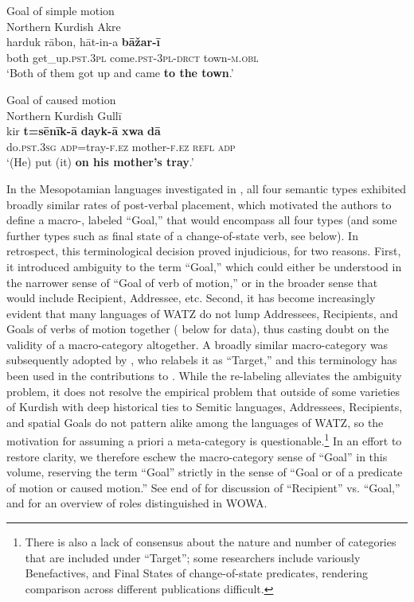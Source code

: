 \documentclass[output=paper,colorlinks,citecolor=brown,collectionchapter]{langscibook}
\begin{document}
\ea\label{Intro:ex:4} 
Goal of simple motion \\
Northern Kurdish Akre \citep{mackenzie_kurdish_1962} \\
\gll harduk rābon, hāt-in-a \textbf{bāžar-ī}  \\
both get\_up\textsc{.pst.3pl} come\textsc{.pst-3pl-drct} town\textsc{-m.obl} \\
\glt `Both of them got up and came \textbf{to the town}.'
\z

\ea\label{Intro:ex:5} 
Goal of caused motion  \\
Northern Kurdish Gullī \citep{mackenzie_kurdish_1962} \\
\gll kir \textbf{t=sēnīk-ā} \textbf{dayk-ā} \textbf{xwa} \textbf{dā} \\
do\textsc{.pst.3sg} \textsc{adp=}tray\textsc{-f.ez} mother\textsc{-f.ez} \textsc{refl} \textsc{adp} \\
\glt `(He) put (it) \textbf{on his mother's tray}.'
\z

In the Mesopotamian languages investigated in \citet{haig_post-predicate_2014}, all four semantic types exhibited broadly similar rates of post-verbal placement, which motivated the authors to define a macro-, labeled ``Goal,'' that would encompass all four types (and some further types such as final state of a change-of-state verb, see below). In retrospect, this terminological decision proved injudicious, for two reasons. First, it introduced ambiguity to the term ``Goal,'' which could either be understood in the narrower sense of ``Goal of verb of motion,'' or in the broader sense that would include Recipient, Addressee, etc. Second, it has become increasingly evident that many languages of WATZ do not lump Addressees, Recipients, and Goals of verbs of motion together ( below for data), thus casting doubt on the validity of a macro-category altogether. A broadly similar macro-category was subsequently adopted by \citet{asadpour_typologizing_2022,asadpour_word_2022}, who relabels it as ``Target,'' and this terminology has been used in the contributions to \citet{asadpour_Jugel_2022}. While the re-labeling alleviates the ambiguity problem, it does not resolve the empirical problem that outside of some varieties of Kurdish with deep historical ties to Semitic languages, Addressees, Recipients, and spatial Goals do not pattern alike among the  languages of WATZ, so the motivation for assuming a priori a meta-category is questionable.\footnote{There is also a lack of consensus about the nature and number of categories that are included under ``Target''; some researchers include variously Benefactives, and Final States of change-of-state predicates, rendering comparison across different publications difficult.} In an effort to restore clarity, we therefore eschew the macro-category sense of ``Goal'' in this volume, reserving the term ``Goal'' strictly in the sense of ``Goal or  of a predicate of motion or caused motion.'' See end of  for discussion of ``Recipient'' vs. ``Goal,'' and  for an overview of roles distinguished in WOWA.
\end{document}
